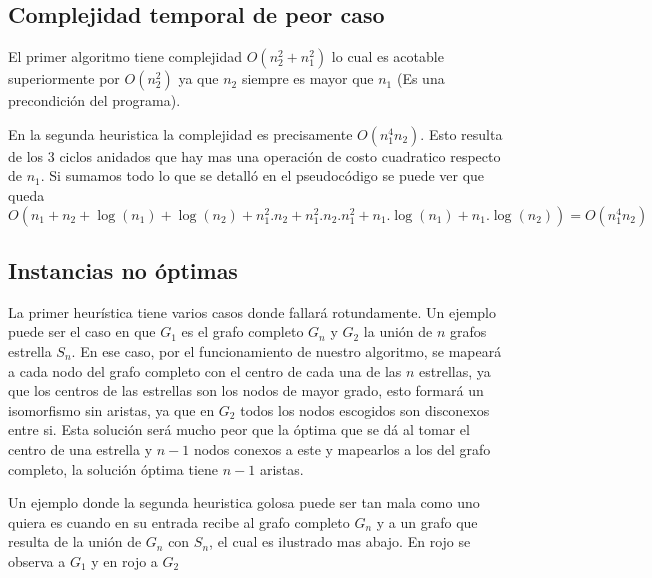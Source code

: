 \subsection{Complejidad temporal de peor caso}

El primer algoritmo tiene complejidad $O(n_2^2 + n_1^2)$ lo cual es acotable superiormente por $O(n_2^2)$ ya que $n_2$ siempre es mayor que $n_1$ (Es una precondición del programa).

En la segunda heuristica la complejidad es precisamente $O(n_1^4 n_2)$. Esto resulta de los 3 ciclos anidados que hay mas una operación de costo cuadratico respecto de $n_1$. Si sumamos todo lo que se detalló en el pseudocódigo se puede ver que queda $O(n_1 + n_2 + \log(n_1) + \log(n_2) + n_1^2.n_2 + n_1^2.n_2.n_1^2 + n_1.\log(n_1) + n_1.\log(n_2)) = O(n_1^4 n_2)$

\subsection{Instancias no óptimas}

La primer heurística tiene varios casos donde fallará rotundamente. Un ejemplo puede ser el caso en que $G_1$ es el grafo completo $G_n$ y $G_2$ la unión de $n$ grafos estrella $S_n$. En ese caso, por el funcionamiento de nuestro algoritmo, se mapeará a cada nodo del grafo completo con el centro de cada una de las $n$ estrellas, ya que los centros de las estrellas son los nodos de mayor grado, esto formará un isomorfismo sin aristas, ya que en $G_2$ todos los nodos escogidos son disconexos entre si. Esta solución será mucho peor que la óptima que se dá al tomar el centro de una estrella y $n-1$ nodos conexos a este y mapearlos a los del grafo completo, la solución óptima tiene $n-1$ aristas.


Un ejemplo donde la segunda heuristica golosa puede ser tan mala como uno quiera es cuando en su entrada recibe al grafo completo $G_n$ y a un grafo que resulta de la unión de $G_n$ con $S_n$, el cual es ilustrado mas abajo. En rojo se observa a $G_1$ y en rojo a $G_2$


